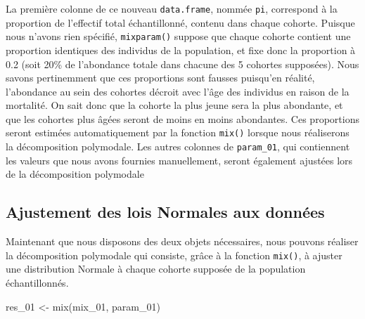 \documentclass[
  french,
  a4paper,
  DIV=11,
  numbers=noendperiod,
  oneside]{scrreprt}
\newenvironment{Shaded}{}{}
\newcommand{\FunctionTok}[1]{\textcolor[rgb]{0.44,0.26,0.76}{#1}}
\newcommand{\NormalTok}[1]{\textcolor[rgb]{0.14,0.16,0.18}{#1}}
\newcommand{\OtherTok}[1]{\textcolor[rgb]{0.44,0.26,0.76}{#1}}
\begin{document}
\begin{tcolorbox}

La première colonne de ce nouveau \texttt{data.frame}, nommée
\texttt{pi}, correspond à la proportion de l'effectif total
échantillonné, contenu dans chaque cohorte. Puisque nous n'avons rien
spécifié, \texttt{mixparam()} suppose que chaque cohorte contient une
proportion identiques des individus de la population, et fixe donc la
proportion à 0.2 (soit 20\% de l'abondance totale dans chacune des 5
cohortes supposées). Nous savons pertinemment que ces proportions sont
fausses puisqu'en réalité, l'abondance au sein des cohortes décroit avec
l'âge des individus en raison de la mortalité. On sait donc que la
cohorte la plus jeune sera la plus abondante, et que les cohortes plus
âgées seront de moins en moins abondantes. Ces proportions seront
estimées automatiquement par la fonction \texttt{mix()} lorsque nous
réaliserons la décomposition polymodale. Les autres colonnes de
\texttt{param\_01}, qui contiennent les valeurs que nous avons fournies
manuellement, seront également ajustées lors de la décomposition
polymodale

\subsection{Ajustement des lois Normales aux
données}\label{ajustement-des-lois-normales-aux-donnuxe9es}

Maintenant que nous disposons des deux objets nécessaires, nous pouvons
réaliser la décomposition polymodale qui consiste, grâce à la fonction
\texttt{mix()}, à ajuster une distribution Normale à chaque cohorte
supposée de la population échantillonnés.

\begin{Shaded}
\begin{Highlighting}[]
\NormalTok{res\_01 }\OtherTok{\textless{}{-}} \FunctionTok{mix}\NormalTok{(mix\_01, param\_01)}
\end{Highlighting}
\end{Shaded}


\end{tcolorbox}
\end{document}

